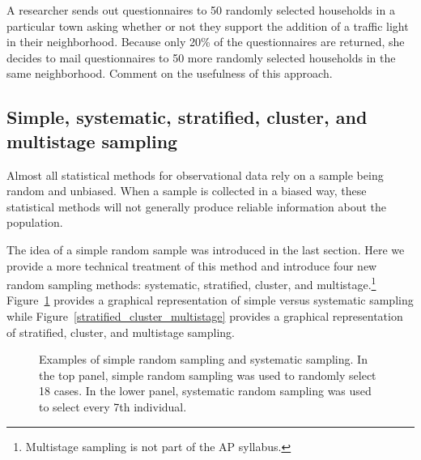 \D{\newpage}

\begin{exercisewrap}
\begin{nexercise}
A researcher sends out questionnaires to 50 randomly selected households in a particular town asking whether or not they support the addition of a traffic light in their neighborhood. Because only 20\% of the questionnaires are returned, she decides to mail questionnaires to 50 more randomly selected households in the same neighborhood. Comment on the usefulness of this approach.\footnotemark
\end{nexercise}
\end{exercisewrap}





\subsection[Simple, systematic, stratified, cluster, and multistage sampling]{Simple, systematic, stratified, cluster, and multistage sampling}
\label{threeSamplingMethods}

Almost all statistical methods for observational data rely on a sample being random and unbiased. When a sample is collected in a biased way, these statistical methods will not generally produce reliable information about the population.

The idea of a simple random sample was introduced in the last section. Here we provide a more technical treatment of this method and introduce four new random sampling methods: systematic, stratified, cluster, and multistage.\footnote{Multistage sampling is not part of the AP syllabus.} Figure~\ref{simple_systematic} provides a graphical representation of simple versus systematic sampling while Figure~\ref{stratified_cluster_multistage} provides a graphical representation of stratified, cluster, and multistage sampling.


\begin{figure}[p]
\centering
{}
\caption{Examples of simple random sampling and systematic sampling. In the top panel, simple random sampling was used to randomly select 18 cases. In the lower panel, systematic random sampling was used to select every 7th individual.}
\label{simple_systematic}
\end{figure}

